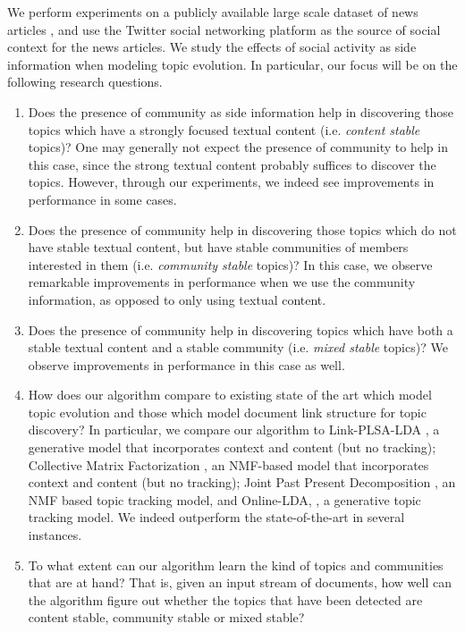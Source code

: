We perform experiments on a publicly available large scale dataset of news articles
\cite{YatesTrumper:2013}, and use the Twitter social networking platform as the
source of social context for the news articles.
We study the effects of social activity as side information when modeling topic evolution.
In particular, our focus will be on the following research questions. 
\begin{enumerate}
\item Does the presence of community as side information help in discovering those topics which have a strongly
focused textual content (i.e. \emph{content stable} topics)?  One may generally
not expect the presence of community to help in this case, since the strong textual content probably
suffices to discover the topics.  However, through our experiments, we indeed see improvements in performance
in some cases. \label{q:q2}
\item Does the presence of community help in discovering those topics which do not have stable textual
content, but have stable communities of members interested in them (i.e. \emph{community stable} topics)?
In this case, we observe remarkable improvements in performance when we use the community information, as
opposed to only using textual content. \label{q:q3}
\item Does the presence of community help in discovering topics which have both a stable textual
content and a stable community (i.e. \emph{mixed stable} topics)?  We observe improvements in performance
in this case as well. \label{q:q4}
\item How does our algorithm compare to existing state of the art which model topic evolution
and those which model document link structure for topic discovery?  In particular, we compare
our algorithm to Link-PLSA-LDA \cite{AlSumait:2008}, a generative model that incorporates context and content (but no tracking); 
Collective Matrix Factorization \cite{Saveski:2014, Ding:2014}, an NMF-based model that incorporates context
and content (but no tracking); Joint Past Present Decomposition \cite{Vaca:2014}, an NMF based topic tracking model, 
and Online-LDA, \cite{Nallapati:2008}, a generative topic tracking model.  
We indeed outperform the state-of-the-art in several instances. \label{q:q5}
\item To what extent can our algorithm 
learn the kind of topics and communities that are at hand?  That is, given
an input stream of documents, how well can the algorithm figure out whether the topics that have been detected
are content stable, community stable or mixed stable? \label{q:q1}
\end{enumerate}

